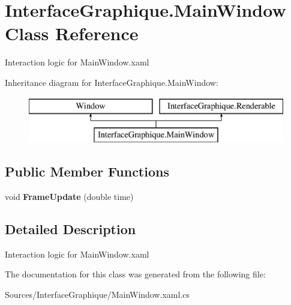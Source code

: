 \hypertarget{class_interface_graphique_1_1_main_window}{}\section{Interface\+Graphique.\+Main\+Window Class Reference}
\label{class_interface_graphique_1_1_main_window}


Interaction logic for Main\+Window.\+xaml  


Inheritance diagram for Interface\+Graphique.\+Main\+Window\+:\begin{figure}[H]
\begin{center}
\leavevmode
\includegraphics[height=2.000000cm]{class_interface_graphique_1_1_main_window}
\end{center}
\end{figure}
\subsection*{Public Member Functions}
\begin{DoxyCompactItemize}
\item 
\hypertarget{class_interface_graphique_1_1_main_window_af11d0f6c1d6519e421d5704f6a19c934}{}void {\bfseries Frame\+Update} (double time)\label{class_interface_graphique_1_1_main_window_af11d0f6c1d6519e421d5704f6a19c934}

\end{DoxyCompactItemize}


\subsection{Detailed Description}
Interaction logic for Main\+Window.\+xaml 



The documentation for this class was generated from the following file\+:\begin{DoxyCompactItemize}
\item 
Sources/\+Interface\+Graphique/Main\+Window.\+xaml.\+cs\end{DoxyCompactItemize}
